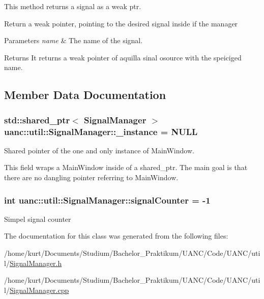 This method returns a signal as a weak ptr. 

Return a weak pointer, pointing to the desired signal inside if the manager


\begin{DoxyParams}{Parameters}
{\em name} & The name of the signal.\\
\hline
\end{DoxyParams}
\begin{DoxyReturn}{Returns}
It returns a weak pointer of aquilla sinal osource with the speiciged name. 
\end{DoxyReturn}


\subsection{Member Data Documentation}
\subsubsection[{\texorpdfstring{\+\_\+instance}{_instance}}]{\setlength{\rightskip}{0pt plus 5cm}std\+::shared\+\_\+ptr$<$ {\bf Signal\+Manager} $>$ uanc\+::util\+::\+Signal\+Manager\+::\+\_\+instance = N\+U\+LL\hspace{0.3cm}{\ttfamily [static]}}\hypertarget{classuanc_1_1util_1_1_signal_manager_a44536c4ffe270bbba74fac4289017399}{}\label{classuanc_1_1util_1_1_signal_manager_a44536c4ffe270bbba74fac4289017399}


Shared pointer of the one and only instance of Main\+Window. 

This field wraps a Main\+Window inside of a shared\+\_\+ptr. The main goal is that there are no dangling pointer referring to Main\+Window. 
\subsubsection[{\texorpdfstring{signal\+Counter}{signalCounter}}]{\setlength{\rightskip}{0pt plus 5cm}int uanc\+::util\+::\+Signal\+Manager\+::signal\+Counter = -\/1}\hypertarget{classuanc_1_1util_1_1_signal_manager_a8f433e771d5933242b75e35397078ecb}{}\label{classuanc_1_1util_1_1_signal_manager_a8f433e771d5933242b75e35397078ecb}
Simpel signal counter 

The documentation for this class was generated from the following files\+:\begin{DoxyCompactItemize}
\item 
/home/kurt/\+Documents/\+Studium/\+Bachelor\+\_\+\+Praktikum/\+U\+A\+N\+C/\+Code/\+U\+A\+N\+C/util/\hyperlink{_signal_manager_8h}{Signal\+Manager.\+h}\item 
/home/kurt/\+Documents/\+Studium/\+Bachelor\+\_\+\+Praktikum/\+U\+A\+N\+C/\+Code/\+U\+A\+N\+C/util/\hyperlink{_signal_manager_8cpp}{Signal\+Manager.\+cpp}\end{DoxyCompactItemize}
